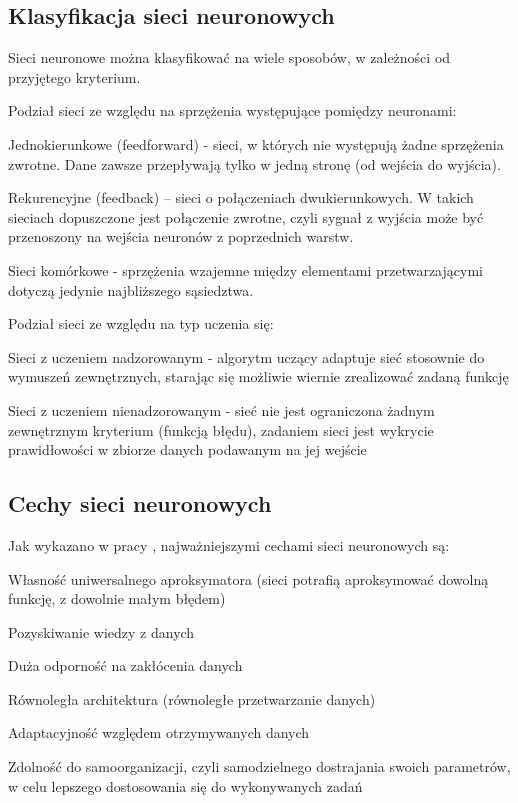 \subsection{Klasyfikacja sieci neuronowych}
Sieci neuronowe można klasyfikować na wiele sposobów, w zależności od przyjętego kryterium.
\begin{enumerate*}
\item Podział sieci ze względu na sprzężenia występujące pomiędzy neuronami:
\begin{itemize*}
\item Jednokierunkowe (feedforward) - sieci, w których nie występują żadne
sprzężenia zwrotne. Dane zawsze przepływają tylko w jedną stronę (od
wejścia do wyjścia).
\item Rekurencyjne (feedback) – sieci o połączeniach dwukierunkowych.
W takich sieciach dopuszczone jest połączenie zwrotne, czyli sygnał z
wyjścia może być przenoszony na wejścia neuronów z poprzednich warstw.
\item Sieci komórkowe - sprzężenia wzajemne między elementami
przetwarzającymi dotyczą jedynie najbliższego sąsiedztwa.
\end{itemize*}
\item Podział sieci ze względu na typ uczenia się:
\begin{itemize*}
\item Sieci z uczeniem nadzorowanym - algorytm uczący adaptuje sieć stosownie do wymuszeń zewnętrznych, starając się możliwie wiernie zrealizować zadaną funkcję
\item Sieci z uczeniem nienadzorowanym - sieć nie jest ograniczona żadnym zewnętrznym kryterium (funkcją błędu), zadaniem sieci jest wykrycie prawidłowości w
zbiorze danych podawanym na jej wejście
\end{itemize*}
\end{enumerate*}

\newpage
\subsection{Cechy sieci neuronowych}
Jak wykazano w pracy \cite{dudek:wyklad:sieciAproksymacja}, najważniejszymi cechami sieci neuronowych są:
\begin{enumerate*}
\item Własność uniwersalnego aproksymatora (sieci potrafią aproksymować dowolną funkcję, z dowolnie małym błędem)
\item Pozyskiwanie wiedzy z danych
\item Duża odporność na zakłócenia danych
\item Równoległa architektura (równoległe przetwarzanie danych)
\item Adaptacyjność względem otrzymywanych danych
\item Zdolność do samoorganizacji, czyli samodzielnego dostrajania swoich
parametrów, w celu lepszego dostosowania się do wykonywanych zadań
\end{enumerate*}

